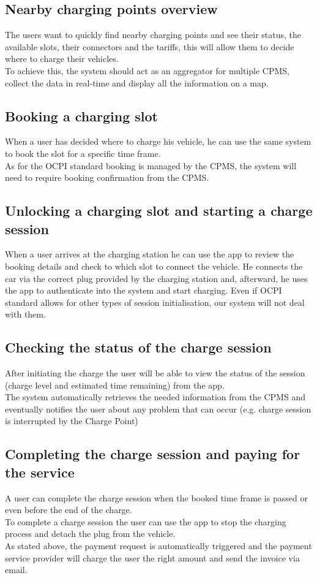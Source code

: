 \subsection{Nearby charging points overview}
The users want to quickly find nearby charging points and see their status, the available slots, their connectors and the tariffs, this will allow them to decide where to charge their vehicles.\\
To achieve this, the system should act as an aggregator for multiple CPMS, collect the data in real-time and display all the information on a map.

\subsection{Booking a charging slot}
When a user has decided where to charge his vehicle, he can use the same system to book the slot for a specific time frame.\\
As for the OCPI standard booking is managed by the CPMS, the system will need to require booking confirmation from the CPMS.

\subsection{Unlocking a charging slot and starting a charge session}
When a user arrives at the charging station he can use the app to review the booking details and check to which slot to connect the vehicle. He connects the car via the correct plug provided by the charging station and, afterward, he uses the app to authenticate into the system and start charging. Even if OCPI standard allows for other types of session initialisation, our system will not deal with them.

\subsection{Checking the status of the charge session}
After initiating the charge the user will be able to view the status of the session (charge level and estimated time remaining) from the app.\\
The system automatically retrieves the needed information from the CPMS and eventually notifies the user about any problem that can occur (e.g. charge session is interrupted by the Charge Point)

\newpage

\subsection{Completing the charge session and paying for the service}
A user can complete the charge session when the booked time frame is passed or even before the end of the charge.\\
To complete a charge session the user can use the app to stop the charging process and detach the plug from the vehicle.\\
As stated above, the payment request is automatically triggered and the payment service provider will charge the user the right amount and send the invoice via email.

